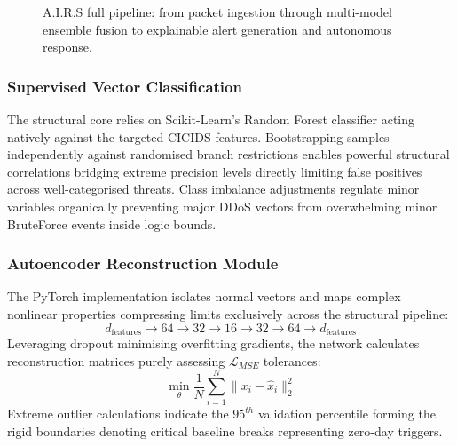 \documentclass[conference]{IEEEtran}
\begin{document}
\begin{figure}[!t]
{%
}
\caption{A.I.R.S full pipeline: from packet ingestion through multi-model ensemble fusion to explainable alert generation and autonomous response.}
\label{fig:hybrid_arch}
\vspace{-0.5em}
\end{figure}

\subsubsection{Supervised Vector Classification}
The structural core relies on Scikit-Learn's Random Forest classifier acting natively against the targeted CICIDS features. Bootstrapping samples independently against randomised branch restrictions enables powerful structural correlations bridging extreme precision levels directly limiting false positives across well-categorised threats. Class imbalance adjustments regulate minor variables organically preventing major DDoS vectors from overwhelming minor BruteForce events inside logic bounds.

\subsubsection{Autoencoder Reconstruction Module}
The PyTorch implementation isolates normal vectors and maps complex nonlinear properties compressing limits exclusively across the structural pipeline:
\[
    {d_{\text{features}}} \rightarrow 64 \rightarrow 32 \rightarrow 16 \rightarrow 32 \rightarrow 64 \rightarrow {d_{\text{features}}}
\]
Leveraging dropout minimising overfitting gradients, the network calculates reconstruction matrices purely assessing $\mathcal{L}_{MSE}$ tolerances:
\begin{equation}
    \min_\theta \frac{1}{N} \sum_{i=1}^{N} \|x_i - \hat{x}_i\|_2^2
\end{equation}
Extreme outlier calculations indicate the $95^{th}$ validation percentile forming the rigid boundaries denoting critical baseline breaks representing zero-day triggers.
\end{document}
